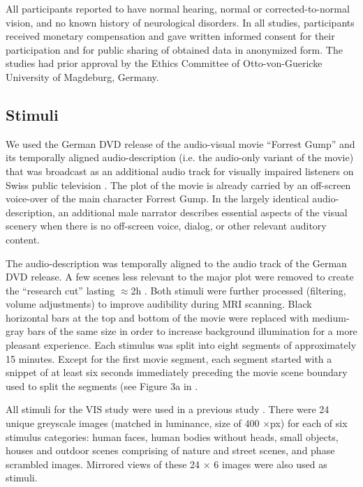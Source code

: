 \documentclass[english]{article}
\begin{document}
All participants reported to have normal hearing, normal or corrected-to-normal
vision, and no known history of neurological disorders.
In all studies, participants received monetary compensation and gave written
informed consent for their participation and for public sharing of obtained data
in anonymized form. The studies had prior approval by the Ethics Committee of
Otto-von-Guericke University of Magdeburg, Germany.


\subsection{Stimuli}
We used the German DVD release \citep{ForrestGumpDVD} of the audio-visual movie
``Forrest Gump'' \citep{ForrestGumpMovie} and its temporally aligned
audio-description (i.e. the audio-only variant of the movie) that was broadcast
as an additional audio track for visually impaired listeners on Swiss public
television \citep{ForrestGumpGermanAD}.
The plot of the movie is already carried by an off-screen voice-over of the main
character Forrest Gump. In the largely identical audio-description, an
additional male narrator describes essential aspects of the visual scenery when
there is no off-screen voice, dialog, or other relevant auditory content.

The audio-description was temporally aligned to the audio track of the German
DVD release. A few scenes less relevant to the major plot were removed to create
the ``research cut'' lasting $\approx$2h \citep{hanke2014audiomovie,
hanke2016simultaneous}.
Both stimuli were further processed (filtering, volume adjustments) to improve
audibility during MRI scanning. Black horizontal bars at the top and bottom of
the movie were replaced with medium-gray bars of the same size in order to
increase background illumination for a more pleasant experience.
Each stimulus was split into eight segments of approximately 15 minutes. Except
for the first movie segment, each segment started with a snippet of at least six
seconds immediately preceding the movie scene boundary used to split the
segments (see Figure 3a in \citep{hanke2014audiomovie}.

All stimuli for the VIS study were used in a previous study
\citep{haxby2011common}. There were 24 unique greyscale images (matched in
luminance, size of 400 $\times$\unit[400]{px}) for each of six stimulus
categories: human faces, human bodies without heads, small objects, houses and
outdoor scenes comprising of nature and street scenes, and phase scrambled
images. Mirrored views of these 24 $\times$ 6 images were also used as stimuli.
\end{document}
